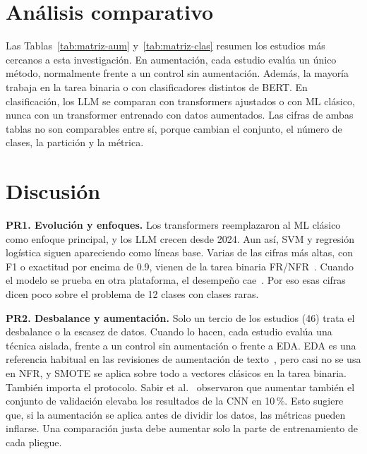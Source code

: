 \documentclass[conference]{IEEEtran}
\begin{document}
\section{Análisis comparativo}\label{sec:comparativo}
Las Tablas~\ref{tab:matriz-aum} y~\ref{tab:matriz-clas} resumen los estudios más cercanos a esta investigación. En aumentación, cada estudio evalúa un único método, normalmente frente a un control sin aumentación. Además, la mayoría trabaja en la tarea binaria o con clasificadores distintos de BERT. En clasificación, los LLM se comparan con transformers ajustados o con ML clásico, nunca con un transformer entrenado con datos aumentados. Las cifras de ambas tablas no son comparables entre sí, porque cambian el conjunto, el número de clases, la partición y la métrica.

\section{Discusión}\label{sec:discusion}
\textbf{PR1. Evolución y enfoques.} Los transformers reemplazaron al ML clásico como enfoque principal, y los LLM crecen desde 2024. Aun así, SVM y regresión logística siguen apareciendo como líneas base. Varias de las cifras más altas, con F1 o exactitud por encima de 0.9, vienen de la tarea binaria FR/NFR~\cite{Suchi2024-Explainable,Sonawane2025-Classification,Rahman2026-RequiBERT}. Cuando el modelo se prueba en otra plataforma, el desempeño cae~\cite{Kamal2025-Robust}. Por eso esas cifras dicen poco sobre el problema de 12 clases con clases raras.

\textbf{PR2. Desbalance y aumentación.} Solo un tercio de los estudios (46) trata el desbalance o la escasez de datos. Cuando lo hacen, cada estudio evalúa una técnica aislada, frente a un control sin aumentación o frente a EDA. EDA es una referencia habitual en las revisiones de aumentación de texto~\cite{Feng2021-DASurvey,Bayer2022-DASurvey}, pero casi no se usa en NFR, y SMOTE se aplica sobre todo a vectores clásicos en la tarea binaria. También importa el protocolo. Sabir et al.~\cite{Sabir2022-Custom} observaron que aumentar también el conjunto de validación elevaba los resultados de la CNN en 10\,\%. Esto sugiere que, si la aumentación se aplica antes de dividir los datos, las métricas pueden inflarse. Una comparación justa debe aumentar solo la parte de entrenamiento de cada pliegue.
\end{document}
